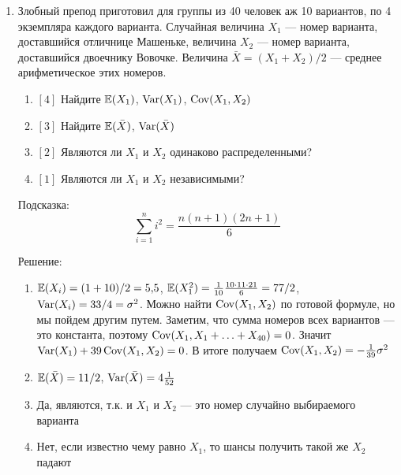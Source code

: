 \documentclass[12pt, a4paper]{article}\usepackage[]{graphicx}\usepackage[]{color}
\begin{document}
\begin{enumerate}
\begin{enumerate}
			\end{enumerate}



			\item Злобный препод приготовил для группы из 40 человек аж 10 вариантов, по 4 экземпляра каждого варианта. Случайная величина $X_1$ — номер варианта, доставшийся отличнице Машеньке, величина $X_2$ — номер варианта, доставшийся двоечнику Вовочке. Величина $\bar{X}=(X_1+X_2)/2$ — среднее арифметическое этих номеров.
			\begin{enumerate}
				\item $[4]$ Найдите $\mathbb{E}(X_1)$, $\operatorname{Var}(X_1)$, $\operatorname{Cov}(X_1,X_2)$
				\item $[3]$ Найдите $\mathbb{E}(\bar{X})$, $\operatorname{Var}(\bar{X})$
				\item $[2]$ Являются ли $X_1$ и $X_2$ одинаково распределенными?
				\item $[1]$ Являются ли $X_1$ и $X_2$ независимыми?
			\end{enumerate}

			Подсказка:
			\begin{equation}
			\sum_{i=1}^{n} i^2=\frac{n(n+1)(2n+1)}{6}
			\end{equation}

			Решение:
			\begin{enumerate}
				\item $\mathbb{E}(X_i)=(1+10)/2=5{,}5$, $\mathbb{E}(X_1^2)=\frac{1}{10}\frac{10\cdot 11\cdot 21}{6}=77/2$, $\operatorname{Var}(X_i)=33/4=\sigma^2$.
				Можно найти $\operatorname{Cov}(X_1,X_2)$ по готовой формуле, но мы пойдем другим путем. Заметим, что сумма номеров всех вариантов — это константа, поэтому $\operatorname{Cov}(X_1,X_1+\ldots+X_{40})=0$. Значит $\operatorname{Var}(X_1)+39\operatorname{Cov}(X_1,X_2)=0$. В итоге получаем $\operatorname{Cov}(X_1,X_2)=-\frac{1}{39}\sigma^2$
				\item $\mathbb{E}(\bar{X})=11/2$, $\operatorname{Var}(\bar{X})=4\frac{1}{52}$
				\item Да, являются, т.к. и $X_1$ и $X_2$ — это номер случайно выбираемого варианта
				\item Нет, если известно чему равно $X_1$, то шансы получить такой же $X_2$ падают
			\end{enumerate}




		\end{enumerate}
\end{document}
